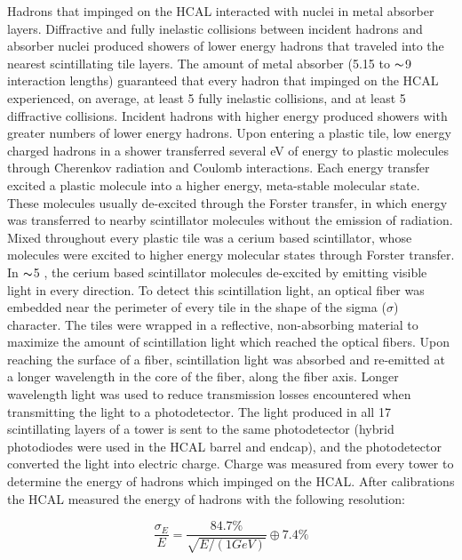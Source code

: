 Hadrons that impinged on the HCAL interacted with nuclei in metal absorber layers.  Diffractive and fully 
inelastic collisions between incident hadrons and absorber nuclei produced showers of lower 
energy hadrons that traveled into the nearest scintillating tile layers.  The amount of metal absorber 
(5.15 to $\thicksim$9 interaction lengths) guaranteed that every hadron that impinged on the HCAL experienced, 
on average, at least 5 fully inelastic collisions, and at least 5 diffractive collisions.  Incident hadrons 
with higher energy produced showers with greater numbers of lower energy hadrons.  Upon entering a plastic tile, 
low energy charged hadrons in a shower transferred several eV of energy to plastic molecules through Cherenkov radiation 
and Coulomb interactions.  Each energy transfer excited a plastic molecule into a higher energy, meta-stable 
molecular state.  These molecules usually de-excited through the Forster transfer, in which energy was 
transferred to nearby scintillator molecules without the emission of radiation.  Mixed throughout every 
plastic tile was a cerium based scintillator, whose molecules were excited to higher energy molecular 
states through Forster transfer.  In $\thicksim$5 \ns, the cerium based scintillator molecules de-excited by emitting 
visible light in every direction.  To detect this scintillation light, an optical fiber was 
embedded near the perimeter of every tile in the shape of the sigma ($\sigma$) character.  The tiles were wrapped in 
a reflective, non-absorbing material to maximize the amount of scintillation light which reached the optical 
fibers.  Upon reaching the surface of a fiber, scintillation light was absorbed and re-emitted at 
a longer wavelength in the core of the fiber, along the fiber axis.  Longer wavelength light was used to reduce 
transmission losses encountered when transmitting the light to a photodetector.  The light produced in all 17 scintillating 
layers of a tower is sent to the same photodetector (hybrid photodiodes were used in the HCAL barrel and endcap), and 
the photodetector converted the light into electric charge.  Charge was measured from every tower to determine 
the energy of hadrons which impinged on the HCAL.  After calibrations the HCAL measured the energy of hadrons
with the following resolution:

\begin{equation}
	\frac{\sigma_{E}}{E} = \frac{84.7\%}{\sqrt{E/(1 GeV)}} \oplus 7.4\%
\end{equation}

